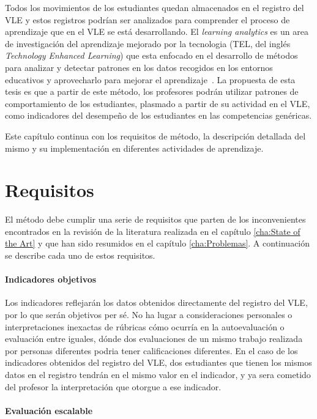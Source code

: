 Todos los movimientos de los estudiantes quedan almacenados en el registro del VLE y estos registros podrían ser analizados para comprender el proceso de aprendizaje que en el VLE se está desarrollando. El \emph{learning analytics} es un area de investigación del aprendizaje mejorado por la tecnologia (TEL, del inglés \emph{Technology Enhanced Learning}) que esta enfocado en el desarrollo de métodos para analizar y detectar patrones en los datos recogidos en los entornos educativos y aprovecharlo para mejorar el aprendizaje~\cite{chatti2014learning}. La propuesta de esta tesis es que a partir de este método, los profesores podrán utilizar patrones de comportamiento de los estudiantes, plasmado a partir de su actividad en el VLE, como indicadores del desempeño de los estudiantes en las competencias genéricas. 

Este capítulo continua con los requisitos de método, la descripción detallada del mismo y su implementación en diferentes actividades de aprendizaje.

\section{Requisitos}

El método debe cumplir una serie de requisitos que parten de los inconvenientes encontrados en la revisión de la literatura realizada en el capítulo \ref{cha:State of the Art} y que han sido resumidos en el capítulo \ref{cha:Problemas}. A continuación se describe cada uno de estos requisitos.

\paragraph*{Indicadores objetivos}

Los indicadores reflejarán los datos obtenidos directamente del registro del VLE, por lo que serán objetivos per sé. No ha lugar a consideraciones personales o interpretaciones inexactas de rúbricas cómo ocurría en la autoevaluación o evaluación entre iguales, dónde dos evaluaciones de un mismo trabajo realizada por personas diferentes podria tener calificaciones diferentes. En el caso de los indicadores obtenidos del registro del VLE, dos estudiantes que tienen los mismos datos en el registro tendrán en el mismo valor en el indicador, y ya sera cometido del profesor la interpretación que otorgue a ese indicador.

\paragraph*{Evaluación escalable}

